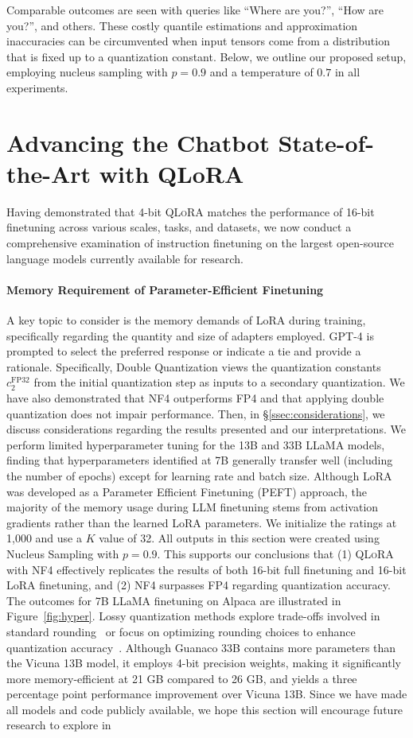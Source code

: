 Comparable outcomes are seen with queries like “Where are you?”, “How are you?”, and others. These costly quantile estimations and approximation inaccuracies can be circumvented when input tensors come from a distribution that is fixed up to a quantization constant. Below, we outline our proposed setup, employing nucleus sampling with $p=0.9$ and a temperature of $0.7$ in all experiments. \section{Advancing the Chatbot State-of-the-Art with QLoRA}
\label{sec:pushing}
Having demonstrated that 4-bit \textsc{QLoRA} matches the performance of 16-bit finetuning across various scales, tasks, and datasets, we now conduct a comprehensive examination of instruction finetuning on the largest open-source language models currently available for research. \paragraph{Memory Requirement of Parameter-Efficient Finetuning} A key topic to consider is the memory demands of LoRA during training, specifically regarding the quantity and size of adapters employed. GPT-4 is prompted to select the preferred response or indicate a tie and provide a rationale. Specifically, Double Quantization views the quantization constants $c_2^{\text{FP32}}$ from the initial quantization step as inputs to a secondary quantization. We have also demonstrated that NF4 outperforms FP4 and that applying double quantization does not impair performance. Then, in \S\ref{ssec:considerations}, we discuss considerations regarding the results presented and our interpretations. We perform limited hyperparameter tuning for the 13B and 33B LLaMA models, finding that hyperparameters identified at 7B generally transfer well (including the number of epochs) except for learning rate and batch size. Although LoRA was developed as a Parameter Efficient Finetuning (PEFT) approach, the majority of the memory usage during LLM finetuning stems from activation gradients rather than the learned LoRA parameters. We initialize the ratings at 1,000 and use a $K$ value of 32. All outputs in this section were created using Nucleus Sampling \cite{holtzmancurious} with $p=0.9$. This supports our conclusions that (1) \textsc{QLoRA} with NF4 effectively replicates the results of both 16-bit full finetuning and 16-bit LoRA finetuning, and (2) NF4 surpasses FP4 regarding quantization accuracy. The outcomes for 7B LLaMA finetuning on Alpaca are illustrated in Figure~\ref{fig:hyper}. Lossy quantization methods explore trade-offs involved in standard rounding~\citep{dettmers2022case,zeng2022glm,pope2022efficiently} or focus on optimizing rounding choices to enhance quantization accuracy~\citep{frantar2022gptq}. Although {Guanaco} 33B contains more parameters than the Vicuna 13B model, it employs 4-bit precision weights, making it significantly more memory-efficient at 21 GB compared to 26 GB, and yields a three percentage point performance improvement over Vicuna 13B. Since we have made all models and code publicly available, we hope this section will encourage future research to explore in 